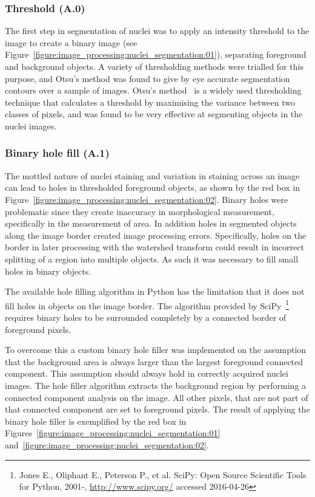 \subsubsection{Threshold (A.0)}
The first step in segmentation of nuclei was to apply an intensity threshold to the image to create a binary image (see Figure~\ref{figure:image_processing:nuclei_segmentation:01}), separating foreground and background objects. A variety of thresholding methods were trialled for this purpose, and Otsu's method was found to give by eye accurate segmentation contours over a sample of images. Otsu's method~\cite{Otsu1979} is a widely used thresholding technique that calculates a threshold by maximising the variance between two classes of pixels, and was found to be very effective at segmenting objects in the nuclei images.

\subsubsection{Binary hole fill (A.1)}
The mottled nature of nuclei staining and variation in staining across an image can lead to holes in thresholded foreground objects, as shown by the red box in Figure~\ref{figure:image_processing:nuclei_segmentation:02}. Binary holes were problematic since they create inaccuracy in morphological measurement, specifically in the measurement of area. In addition holes in segmented objects along the image border created image processing errors. Specifically, holes on the border in later processing with the watershed transform could result in incorrect splitting of a region into multiple objects. As such it was necessary to fill small holes in binary objects.

The available hole filling algorithm in Python has the limitation that it does not fill holes in objects on the image border. The algorithm provided by SciPy~\footnote{Jones E., Oliphant E., Peterson P., et al. SciPy: Open Source Scientific Tools for Python, 2001-, \url{http://www.scipy.org/} accessed 2016-04-26} requires binary holes to be surrounded completely by a connected border of foreground pixels.

To overcome this a custom binary hole filler was implemented on the assumption that the background area is always larger than the largest foreground connected component. This assumption should always hold in correctly acquired nuclei images. The hole filler algorithm extracts the background region by performing a connected component analysis on the image. All other pixels, that are not part of that connected component are set to foreground pixels. The result of applying the binary hole filler is exemplified by the red box in Figures~\ref{figure:image_processing:nuclei_segmentation:01} and~\ref{figure:image_processing:nuclei_segmentation:02}.

